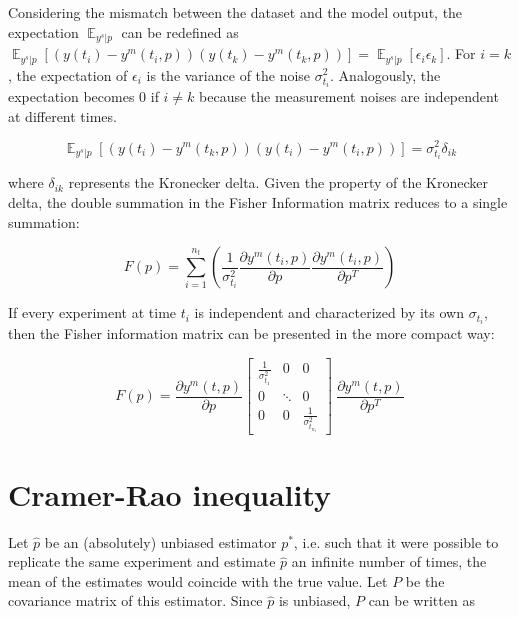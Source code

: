 \documentclass[]{scrartcl}
\begin{document}
Considering the mismatch between the dataset and the model output, the expectation $\mathop{\mathbb{E}}_{y^s|p}$ can be redefined as $\mathop{\mathbb{E}}_{y^s|p} \left[ \left( y(t_i) - y^m(t_i, p) \right) \left( y(t_k) - y^m(t_k, p) \right) \right] = \mathop{\mathbb{E}}_{y^s|p} \left[ \epsilon_i \epsilon_k \right]$. For $i=k$, the expectation of $\epsilon_i$ is the variance of the noise $\sigma_{t_i}^2$. Analogously, the expectation becomes 0 if $i \neq k$ because the measurement noises are independent at different times.

\begin{equation}
	\mathop{\mathbb{E}}_{y^s|p} \left[ \left( y(t_i) - y^m(t_k, p) \right) \left( y(t_i) - y^m(t_i, p) \right) \right] = \sigma_{t_i}^2 \delta_{ik}
\end{equation}

where $\delta_{ik}$ represents the Kronecker delta. Given the property of the Kronecker delta, the double summation in the Fisher Information matrix reduces to a single summation:

\begin{equation}
	F(p) = \sum_{i=1}^{n_t} \left( \frac{1}{\sigma_{t_i}^2} \frac{\partial y^m(t_i, p)}{\partial p} \frac{\partial y^m(t_i, p)}{\partial p^T} \right)
\end{equation}

If every experiment at time $t_i$ is independent and characterized by its own $\sigma_{t_i}$, then the Fisher information matrix can be presented in the more compact way:

\begin{equation}
	F(p) = \frac{\partial y^m(t, p)}{\partial p} \begin{bmatrix}
		\frac{1}{\sigma_{t_1}^2} & 0 & 0\\
		0 & \ddots & 0 \\
		0 & 0 & \frac{1}{\sigma_{t_{n_t}}^2} 
	\end{bmatrix}\ \frac{\partial y^m(t, p)}{\partial p^T} 
\end{equation}

\section{Cramer-Rao inequality}

Let $\hat{p}$ be an (absolutely) unbiased estimator $p^*$, i.e. such that it were possible to replicate the same experiment and estimate $\hat{p}$ an infinite number of times, the mean of the estimates would coincide with the true value. Let $P$ be the covariance matrix of this estimator. Since $\hat{p}$ is unbiased, $P$ can be written as
\end{document}
